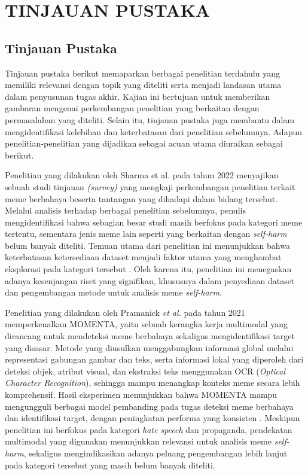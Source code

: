 \newpage
\chapter{TINJAUAN PUSTAKA} \label{Bab II}

\section{Tinjauan Pustaka} \label{II.Tinjauan}
Tinjauan pustaka berikut memaparkan berbagai penelitian terdahulu yang memiliki relevansi dengan topik yang diteliti serta menjadi landasan utama dalam penyusunan tugas akhir. Kajian ini bertujuan untuk memberikan gambaran mengenai perkembangan penelitian yang berkaitan dengan permasalahan yang diteliti. Selain itu, tinjauan pustaka juga membantu dalam mengidentifikasi kelebihan dan keterbatasan dari penelitian sebelumnya. Adapun penelitian-penelitian yang dijadikan sebagai acuan utama diuraikan sebagai berikut.

Penelitian yang dilakukan oleh Sharma et al. pada tahun 2022 menyajikan sebuah studi tinjauan \textit{(survey)} yang mengkaji perkembangan penelitian terkait meme berbahaya beserta tantangan yang dihadapi dalam bidang tersebut. Melalui analisis terhadap berbagai penelitian sebelumnya, penulis mengidentifikasi bahwa sebagian besar studi masih berfokus pada kategori meme tertentu, sementara jenis meme lain seperti yang berkaitan dengan \textit{self-harm} belum banyak diteliti. Temuan utama dari penelitian ini menunjukkan bahwa keterbatasan ketersediaan dataset menjadi faktor utama yang menghambat eksplorasi pada kategori tersebut \cite{Sharma2022HarmfulMemes}. Oleh karena itu, penelitian ini menegaskan adanya kesenjangan riset yang signifikan, khususnya dalam penyediaan dataset dan pengembangan metode untuk analisis meme \textit{self-harm}.

Penelitian yang dilakukan oleh Pramanick \textit{et al.} pada tahun 2021 memperkenalkan MOMENTA, yaitu sebuah kerangka kerja multimodal yang dirancang untuk mendeteksi meme berbahaya sekaligus mengidentifikasi target yang disasar. Metode yang diusulkan menggabungkan informasi global melalui representasi gabungan gambar dan teks, serta informasi lokal yang diperoleh dari deteksi objek, atribut visual, dan ekstraksi teks menggunakan OCR (\textit{Optical Character Recognition}), sehingga mampu menangkap konteks meme secara lebih komprehensif. Hasil eksperimen menunjukkan bahwa MOMENTA mampu mengungguli berbagai model pembanding pada tugas deteksi meme berbahaya dan identifikasi target, dengan peningkatan performa yang konsisten \cite{pramanick2021momenta}. Meskipun penelitian ini berfokus pada kategori \textit{hate speech} dan propaganda, pendekatan multimodal yang digunakan menunjukkan relevansi untuk analisis meme \textit{self-harm}, sekaligus mengindikasikan adanya peluang pengembangan lebih lanjut pada kategori tersebut yang masih belum banyak diteliti.

